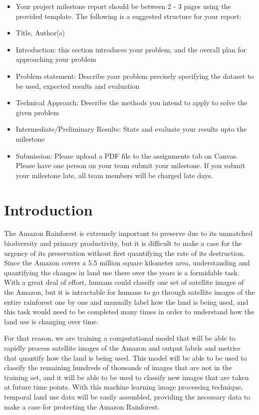 \documentclass[10pt,twocolumn,letterpaper]{article}
\begin{document}
\begin{itemize}
\item Your project milestone report should be between 2 - 3 pages using the provided template. The following is a suggested structure for your report:\newline
\item Title, Author(s)\newline
\item Introduction: this section introduces your problem, and the overall plan for approaching your problem\newline
\item Problem statement: Describe your problem precisely specifying the dataset to be used, expected results and evaluation\newline
\item Technical Approach: Describe the methods you intend to apply to solve the given problem\newline
\item Intermediate/Preliminary Results: State and evaluate your results upto the milestone
\item Submission: Please upload a PDF file to the assignments tab on Canvas. Please have one person on your team submit your milestone. If you submit your milestone late, all team members will be charged late days.
\end{itemize}
\section{Introduction}

	The Amazon Rainforest is extremely important to preserve due to its unmatched biodversity and primary productivity, but it is difficult to make a case for the urgency of its preservation without first quantifying the rate of its destruction.  Since the Amazon covers a 5.5 million square kilometer area, understanding and quantifying the changes in land use there over the years is a formidable task. With a great deal of effort, humans could classify one set of satellite images of the Amazon, but it is intractable for humans to go through satellite images of the entire rainforest one by one and manually label how the land is being used, and this task would need to be completed many times in order to understand how the land use is changing over time.

For that reason, we are training a computational model that will be able to rapidly process satellite images of the Amazon and output labels and metrics that quantify how the land is being used. This model will be able to be used to classify the remaining hundreds of thousands of images that are not in the training set, and it will be able to be used to classify new images that are taken at future time points. With this machine learning image processing technique, temporal land use data will be easily assembled, providing the necessary data to make a case for protecting the Amazon Rainforest.
\end{document}
